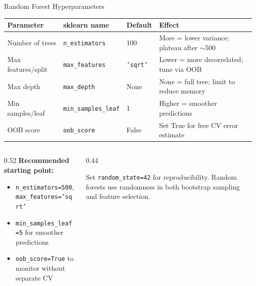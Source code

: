 \documentclass[aspectratio=169, 11pt]{beamer}
\begin{document}
\begin{frame}{Random Forest Hyperparameters}
  \begin{center}
    {\footnotesize
    \begin{tabular}{p{3.0cm}p{2.8cm}p{1.8cm}p{4.0cm}}
      \toprule
      \textbf{Parameter} & \textbf{sklearn name} & \textbf{Default} & \textbf{Effect} \\
      \midrule
      Number of trees & \texttt{n\_estimators} & 100 & More = lower variance; plateau after $\sim$500 \\
      Max features/split & \texttt{max\_features} & \texttt{'sqrt'} & Lower = more decorrelated; tune via OOB \\
      Max depth & \texttt{max\_depth} & None & None = full tree; limit to reduce memory \\
      Min samples/leaf & \texttt{min\_samples\_leaf} & 1 & Higher = smoother predictions \\
      OOB score & \texttt{oob\_score} & False & Set True for free CV error estimate \\
      \bottomrule
    \end{tabular}
    }
  \end{center}
  \begin{columns}[T]
    \begin{column}{0.52\textwidth}
      \textbf{Recommended starting point:}
      \begin{itemize}\footnotesize
        \item \texttt{n\_estimators=500}, \texttt{max\_features='sqrt'}
        \item \texttt{min\_samples\_leaf=5} for smoother predictions
        \item \texttt{oob\_score=True} to monitor without separate CV
      \end{itemize}
    \end{column}
    \begin{column}{0.44\textwidth}
      \begin{warningbox}
        \small Set \texttt{random\_state=42} for reproducibility.
        Random forests use randomness in both bootstrap sampling
        and feature selection.
      \end{warningbox}
    \end{column}
  \end{columns}
\end{frame}

\end{document}
